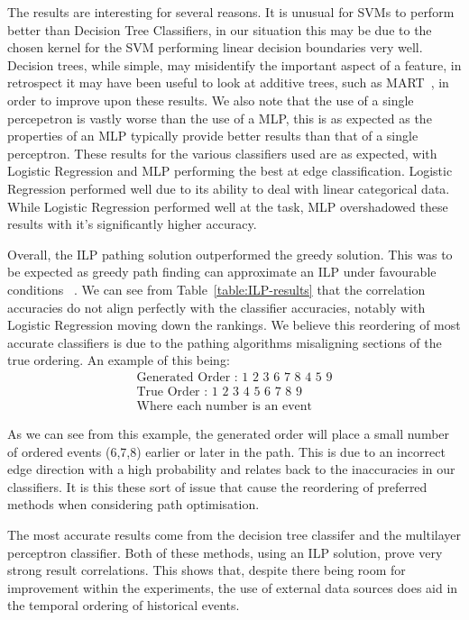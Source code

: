 \documentclass[bsc,frontabs,twoside,singlespacing,parskip,deptreport]{infthesis}     %
\begin{document}
The results are interesting for several reasons.
It is unusual for SVMs to perform better than Decision Tree Classifiers, in our situation this may be due to the chosen
kernel for the SVM performing linear decision boundaries very well. Decision trees, while simple, may misidentify the important
aspect of a  feature, in retrospect it may have been useful to look at additive trees, such as MART~\cite{friedman2001greedy}, in order to
improve upon these results.
We also note that the use of a single percepetron is vastly worse than the use of a MLP, this is as expected as
the properties of an MLP typically provide better results than that of a single perceptron.
These results for the various classifiers used are as expected, with Logistic Regression and MLP performing the best
at edge classification. Logistic Regression performed well due to its ability to deal with linear categorical data.
While Logistic Regression performed well at the task, MLP overshadowed these results with it's significantly higher
accuracy. 


Overall, the ILP pathing solution outperformed the greedy solution. This was to be expected as greedy path finding can
approximate an ILP under favourable conditions ~\cite{schapire1998learning}. We can see from Table~\ref{table:ILP-results} that the
correlation accuracies do not align perfectly with the classifier accuracies, notably with Logistic Regression moving
down the rankings. We believe this reordering of most accurate classifiers is due to the pathing algorithms misaligning
sections of the true ordering. An example of this being:
\begin{align}\nonumber
  \text{Generated Order : 1 2 3 6 7 8 4 5 9}\\\nonumber
  \text{True Order : 1 2 3 4 5 6 7 8 9}\\\nonumber
  \text{Where each number is an event}\nonumber
\end{align}

As we can see from this example, the generated order will place a small number of ordered events (6,7,8) earlier or
later in the path. This is due to an incorrect edge direction with a high probability and relates back to the
inaccuracies in our classifiers. It is this these sort of issue that cause the reordering of preferred methods when considering
path optimisation.

The most accurate results come from the decision tree classifer and the multilayer perceptron classifier.
Both of these methods, using an ILP solution, prove very strong result correlations. This shows that, despite there
being room for improvement within the experiments, the use of external data sources does aid in the temporal ordering
of historical events.
\end{document}
